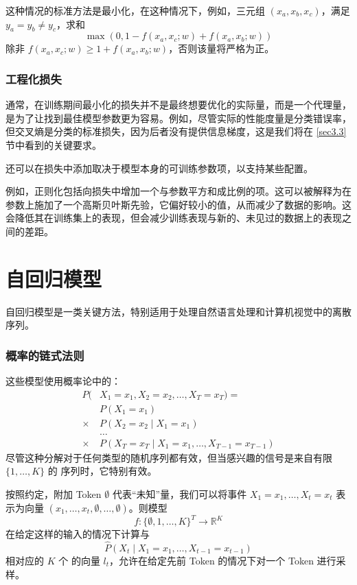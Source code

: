 这种情况的标准方法是最小化，在这种情况下，例如，三元组 $(x_a,x_b,x_c)$，满足 $y_a = y_b \ne y_c$，求和
\[\max(0,1-f(x_a,x_c;w)+f(x_a,x_b;w))\]
除非 $f(x_a,x_c;w) \ge 1+f(x_a,x_b;w)$，否则该量将严格为正。

\subsubsection*{工程化损失}

通常，在训练期间最小化的损失并不是最终想要优化的实际量，而是一个代理量，是为了让找到最佳模型参数更为容易。例如，尽管实际的性能度量是分类错误率，但交叉熵是分类的标准损失，因为后者没有提供信息梯度，这是我们将在 \ref{sec3.3} 节中看到的关键要求。

还可以在损失中添加取决于模型本身的可训练参数项，以支持某些配置。

例如，正则化包括向损失中增加一个与参数平方和成比例的项。这可以被解释为在参数上施加了一个高斯贝叶斯先验，它偏好较小的值，从而减少了数据的影响。这会降低其在训练集上的表现，但会减少训练表现与新的、未见过的数据上的表现之间的差距。

\section{自回归模型}\label{sec3.2}

自回归模型是一类关键方法，特别适用于处理自然语言处理和计算机视觉中的离散序列。

\subsubsection*{概率的链式法则}

这些模型使用概率论中的：
\begin{align*}
    P(&X_1 = x_1,X_2 = x_2,\dots,X_T = x_T) = \\
    &P(X_1 = x_1) \\
    \times &P(X_2 = x_2 \mid X_1 = x_1) \\
    &\dots \\
    \times &P(X_T = x_T \mid X_1 = x_1,\dots,X_{T-1} = x_{T-1})
\end{align*}
尽管这种分解对于任何类型的随机序列都有效，但当感兴趣的信号是来自有限 $\{1, \dots ,K\}$ 的  序列时，它特别有效。

按照约定，附加 Token $\emptyset$ 代表``未知''量，我们可以将事件 ${X_1 = x_1,\dots,X_t = x_t}$ 表示为向量 $(x_1,\dots,x_t,\emptyset,\dots,\emptyset)$。则模型
\[f : \{\emptyset,1,\dots,K\}^T \to \mathbb{R}^K\]
在给定这样的输入的情况下计算与
\[\hat{P}(X_t \mid X_1 = x_1,\dots,X_{t-1} = x_{t-1})\]
相对应的 $K$ 个  的向量 $l_t$，允许在给定先前 Token 的情况下对一个 Token 进行采样。

